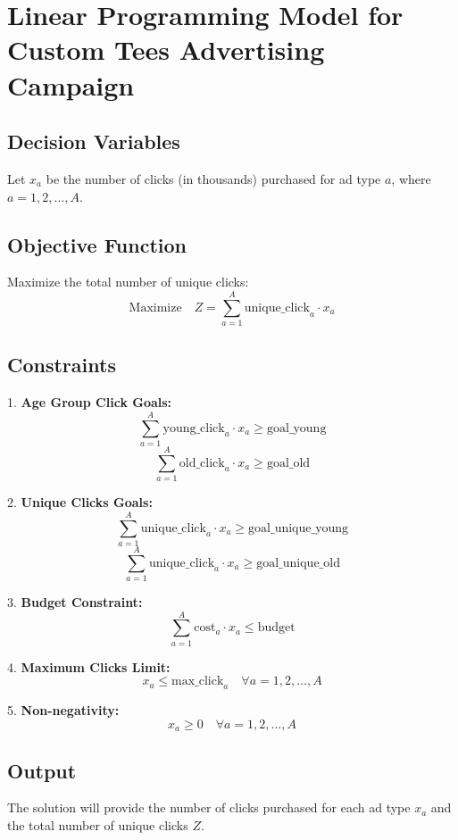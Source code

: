 \documentclass{article}
\begin{document}
\section*{Linear Programming Model for Custom Tees Advertising Campaign}

\subsection*{Decision Variables}
Let \(x_a\) be the number of clicks (in thousands) purchased for ad type \(a\), where \(a = 1, 2, \ldots, A\).

\subsection*{Objective Function}
Maximize the total number of unique clicks:
\[
\text{Maximize} \quad Z = \sum_{a=1}^{A} \text{unique\_click}_{a} \cdot x_a
\]

\subsection*{Constraints}
1. \textbf{Age Group Click Goals:}
   \[
   \sum_{a=1}^{A} \text{young\_click}_{a} \cdot x_a \geq \text{goal\_young}
   \]
   \[
   \sum_{a=1}^{A} \text{old\_click}_{a} \cdot x_a \geq \text{goal\_old}
   \]

2. \textbf{Unique Clicks Goals:}
   \[
   \sum_{a=1}^{A} \text{unique\_click}_{a} \cdot x_a \geq \text{goal\_unique\_young}
   \]
   \[
   \sum_{a=1}^{A} \text{unique\_click}_{a} \cdot x_a \geq \text{goal\_unique\_old}
   \]

3. \textbf{Budget Constraint:}
   \[
   \sum_{a=1}^{A} \text{cost}_{a} \cdot x_a \leq \text{budget}
   \]

4. \textbf{Maximum Clicks Limit:}
   \[
   x_a \leq \text{max\_click}_{a} \quad \forall a = 1, 2, \ldots, A
   \]

5. \textbf{Non-negativity:}
   \[
   x_a \geq 0 \quad \forall a = 1, 2, \ldots, A
   \]

\subsection*{Output}
The solution will provide the number of clicks purchased for each ad type \(x_a\) and the total number of unique clicks \(Z\).
\end{document}
